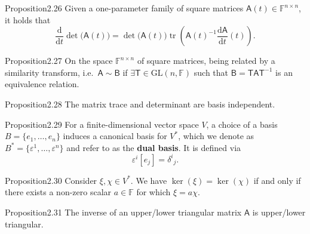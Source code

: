 \begin{res}{Proposition}{2.26}
Given a one-parameter family of square matrices $\mathsf A(t)\in\mathbb F^{n\times n}$, it holds that
\begin{equation}\frac{\mathrm d}{\mathrm dt}\det\bigl(\mathsf A(t)\bigr)=\det\bigl(\mathsf A(t)\bigr)\operatorname{tr}\!\left(\mathsf A(t)^{-1}\frac{\mathrm d\mathsf A}{\mathrm dt}(t)\right).\tag{2.24}\end{equation}
\end{res}

\begin{res}{Proposition}{2.27}
On the space $\mathbb F^{n\times n}$ of square matrices, being related by a similarity transform, i.e.\ $\mathsf A\sim\mathsf B$ if $\exists\mathsf T\in\mathrm{GL}(n,\mathbb F)$ such that $\mathsf B=\mathsf{TAT}^{-1}$ is an equivalence relation.
\end{res}

\begin{res}{Proposition}{2.28}
The matrix trace and determinant are basis independent.
\end{res}

\begin{res}{Proposition}{2.29}
For a finite-dimensional vector space $V$, a choice of a basis $B=\{e_1,\dots,e_n\}$ induces a canonical basis for $V^*$, which we denote as $B^*=\{\varepsilon^1,\dots,\varepsilon^n\}$ and refer to as the \textbf{dual basis}. It is defined via
\begin{equation}\varepsilon^i[e_j]=\delta^i{}_j.\tag{2.30}\end{equation}
\end{res}

\begin{res}{Proposition}{2.30}
Consider $\xi,\chi\in V^*$. We have $\ker(\xi)=\ker(\chi)$ if and only if there exists a non-zero scalar $a\in\mathbb F$ for which $\xi=a\chi$.
\end{res}

\begin{res}{Proposition}{2.31}
The inverse of an upper/lower triangular matrix $\mathsf A$ is upper/lower triangular.
\end{res}
